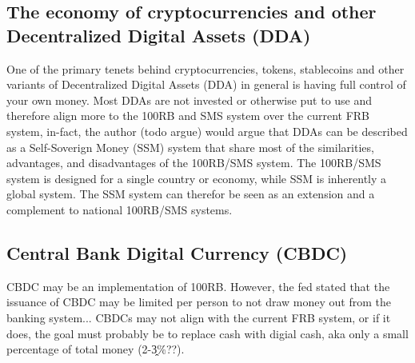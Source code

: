 \subsection{The economy of cryptocurrencies and other Decentralized Digital Assets (DDA)}
One of the primary tenets behind cryptocurrencies, tokens, stablecoins and other variants of Decentralized Digital Assets (DDA) in general is having full control of your own money. Most DDAs are not invested or otherwise put to use and therefore align more to the 100RB and SMS system over the current FRB system, in-fact, the author (todo argue) would argue that DDAs can be described as a Self-Soverign Money (SSM) system that share most of the similarities, advantages, and disadvantages of the 100RB/SMS system. The 100RB/SMS system is designed for a single country or economy, while SSM is inherently a global system. The SSM system can therefor be seen as an extension and a complement to national 100RB/SMS systems.

\subsection{Central Bank Digital Currency (CBDC)}
CBDC may be an implementation of 100RB. However, the fed stated that the issuance of CBDC may be limited per person to not draw money out from the banking system... CBDCs may not align with the current FRB system, or if it does, the goal must probably be to replace cash with digial cash, aka only a small percentage of total money (2-3̭\%??). 